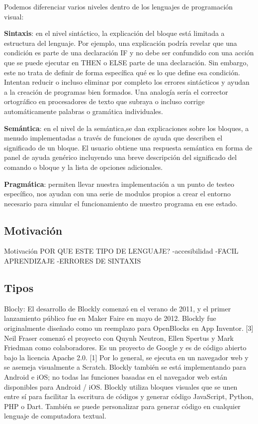 Podemos diferenciar varios niveles dentro de los lenguajes de programación visual:

\textbf{Sintaxis}: en el nivel sintáctico, la explicación del bloque está limitada a
estructura del lenguaje. Por ejemplo, una explicación podría revelar que una condición es parte de una declaración IF y no debe ser confundido con una acción que se puede ejecutar en THEN o ELSE parte de una declaración. Sin embargo, este no trata de definir de forma específica qué es lo que define esa condición.
Intentan reducir o incluso eliminar por completo los errores sintácticos y ayudan a la creación de programas bien formados. Una analogía sería el corrector ortográfico en procesadores de texto que subraya o incluso corrige automáticamente palabras o gramática individuales.	

\textbf{Semántica}: en el nivel de la semántica,se dan explicaciones sobre los bloques, a menudo implementadas a través de funciones de ayuda que describen el significado
de un bloque. El usuario obtiene una respuesta semántica en forma de panel de ayuda genérico incluyendo una breve descripción del significado del comando o bloque y la lista de opciones adicionales.

\textbf{Pragmática}: permiten llevar nuestra implementación a un punto de testeo específico, nos ayudan con una serie de modulos propios a crear el entorno necesario para simular el funcionamiento de nuestro programa en ese estado.

\subsection{Motivación}
\label{subsec:motivacion}
Motivación POR QUE ESTE TIPO DE LENGUAJE?
-accesibilidad
-FACIL APRENDIZAJE
-ERRORES DE SINTAXIS	

\subsection{Tipos}
\label{subsec:tipos}

Blocly: El desarrollo de Blockly comenzó en el verano de 2011, y el primer lanzamiento público fue en Maker Faire en mayo de 2012. Blockly fue originalmente diseñado como un reemplazo para OpenBlocks en App Inventor. [3] Neil Fraser comenzó el proyecto con Quynh Neutron, Ellen Spertus y Mark Friedman como colaboradores.
Es un proyecto de Google y es de código abierto bajo la licencia Apache 2.0. [1] Por lo general, se ejecuta en un navegador web y se asemeja visualmente a Scratch. Blockly también se está implementando para Android e iOS; no todas las funciones basadas en el navegador web están disponibles para Android / iOS.
Blockly utiliza bloques visuales que se unen entre sí para facilitar la escritura de códigos y generar código JavaScript, Python, PHP o Dart. También se puede personalizar para generar código en cualquier lenguaje de computadora textual.

